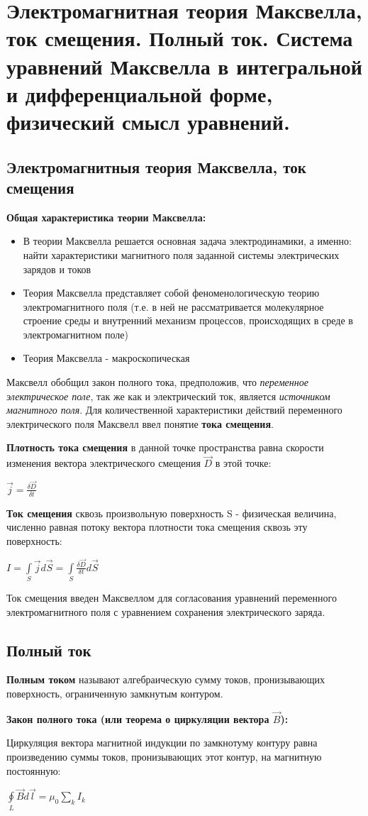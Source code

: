 \documentclass[12pt]{report}
\begin{document}
\section{Электромагнитная теория Максвелла, ток смещения. Полный ток. Система уравнений Максвелла в интегральной и дифференциальной форме, физический смысл уравнений.}
\subsection{Электромагнитныя теория Максвелла, ток смещения}
\textbf{Общая характеристика теории Максвелла:}
\begin{itemize}
    \item В теории Максвелла решается основная задача электродинамики, а именно: найти характеристики магнитного поля заданной системы электрических зарядов и токов
    \item Теория Максвелла представляет собой феноменологическую теорию электромагнитного поля (т.е. в ней не рассматривается молекулярное строение среды и внутренний механизм процессов, происходящих в среде в электромагнитном поле)
    \item Теория Максвелла - макроскопическая
\end{itemize}

Максвелл обобщил закон полного тока, предположив, что \textit{переменное электрическое поле}, так же как и электрический ток, является \textit{источником магнитного поля}. Для количественной характеристики действий переменного электрического поля Максвелл ввел понятие \textbf{тока смещения}.\par
\textbf{Плотность тока смещения} в данной точке пространства равна скорости изменения вектора электрического смещения $\vec {D}$ в этой точке:\par
$\vec {j} = \frac{\delta \vec {D}}{\delta t}$\par
\textbf{Ток смещения} сквозь произвольную поверхность S - физическая величина, численно равная потоку вектора плотности тока смещения сквозь эту поверхность:\par
$I = \int\limits_S {\vec {j} d \vec {S} = \int\limits_S {\frac{\delta \vec {D}}{\delta t}}d \vec {S}}$\par
Ток смещения введен Максвеллом для согласования уравнений переменного электромагнитного поля с уравнением сохранения электрического заряда.

\subsection{Полный ток}
\textbf{Полным током} называют алгебраическую сумму токов, пронизывающих поверхность, ограниченную замкнутым контуром.\par
\textbf{Закон полного тока (или теорема о циркуляции вектора $\vec {B}$):}\par
Циркуляция вектора магнитной индукции по замкнотуму контуру равна произведению суммы токов, пронизывающих этот контур, на магнитную постоянную:\par
$\oint\limits_L {\vec {B} d \vec {l} = \mu_0 \sum\limits_k {I_{k}}}$\par
\end{document}
